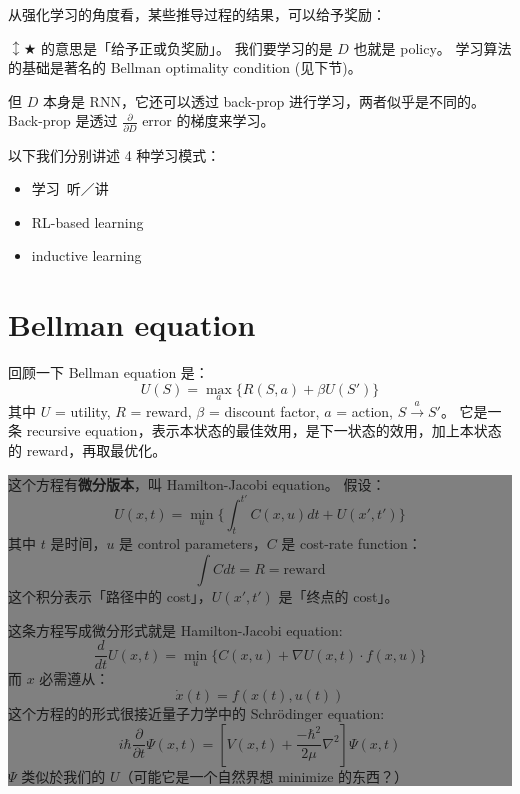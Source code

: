 \documentclass[12pt]{article}
\begin{document}
从强化学习的角度看，某些推导过程的结果，可以给予奖励：
\begin{center}
\end{center}
$\updownarrow \bigstar$ 的意思是「给予正或负奖励」。  我们要学习的是 $D$ 也就是 policy。  学习算法的基础是著名的 Bellman optimality condition (见下节)。

但 $D$ 本身是 RNN，它还可以透过 back-prop 进行学习，两者似乎是不同的。  Back-prop 是透过 $\frac{\partial}{\partial D} \mbox{~error}$ 的梯度来学习。

以下我们分别讲述 4 种学习模式：
\begin{itemize}
\item 学习~听／讲
\item RL-based learning
\item inductive learning
\end{itemize}

\section{Bellman equation}

回顾一下 Bellman equation 是：
$$ U(S) = \max_a \{ R(S,a) + \beta U(S') \}$$
其中 $U$ = utility, $R$ = reward, $\beta$ = discount factor, $a$ = action, $S \stackrel{a}{\longrightarrow} S'$。 它是一条 recursive equation，表示本状态的最佳效用，是下一状态的效用，加上本状态的 reward，再取最优化。

\begin{center}
\colorbox{grey}{\parbox{0.95\textwidth}{\setlength{\parskip}{2.5ex}
这个方程有\textbf{微分版本}，叫 Hamilton-Jacobi equation。 假设：
$$ U(x,t) = \min_u \{ \int_t^{t'} C(x,u)dt + U(x',t') \} $$
其中 $t$ 是时间，$u$ 是 control parameters，$C$ 是 cost-rate function：
$$ \int C dt = R = \mbox{reward} $$
这个积分表示「路径中的 cost」，$U(x',t')$ 是「终点的 cost」。

这条方程写成微分形式就是 Hamilton-Jacobi equation:
$$ \frac{d}{dt} U(x,t) = \min_u \{ C(x,u) + \nabla U(x,t) \cdot f(x,u) \} $$
而 $x$ 必需遵从：
$$ \dot{x}(t) = f(x(t),u(t)) $$
这个方程的的形式很接近量子力学中的 Schr\"{o}dinger equation:
$$ i \hbar \frac{\partial}{\partial t} \Psi(x,t) = \left[ V(x,t) + \frac{-\hbar^2}{2\mu} \nabla^2 \right] \Psi(x,t) $$
$\Psi$ 类似於我们的 $U$（可能它是一个自然界想 minimize 的东西？）
}}
\end{center}
\end{document}
